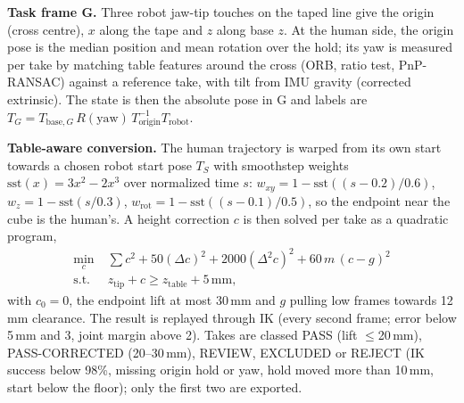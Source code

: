 \documentclass[conference,10pt]{IEEEtran}
\newcommand{\mm}{\,mm\xspace}
\begin{document}
\textbf{Task frame G.} Three robot jaw-tip touches on the taped line give the origin (cross centre), $x$ along the tape and $z$ along
base $z$. At the human side, the origin pose is the median position and mean rotation over the hold; its yaw is measured per take by
matching table features around the cross (ORB, ratio test, PnP-RANSAC) against a reference take, with tilt from IMU gravity
(corrected extrinsic). The state is then the absolute pose in G and labels are $T_G = T_{\text{base},G}\,R(\text{yaw})\,
T_\text{origin}^{-1}T_\text{robot}$.

\textbf{Table-aware conversion.} The human trajectory is warped from its own start towards a chosen robot start pose $T_S$ with
smoothstep weights $\mathrm{sst}(x)=3x^2-2x^3$ over normalized time $s$: $w_{xy}=1-\mathrm{sst}((s-0.2)/0.6)$, $w_z=1-\mathrm{sst}(s/0.3)$,
$w_\text{rot}=1-\mathrm{sst}((s-0.1)/0.5)$, so the endpoint near the cube is the human's. A height correction $c$ is then solved
per take as a quadratic program,
\begin{equation}
\begin{aligned}
\min_c\;& \textstyle\sum c^2+50(\Delta c)^2+2000(\Delta^2 c)^2+60\,m\,(c-g)^2\\
\text{s.t.}\;& z_\text{tip}+c\ge z_\text{table}+5\,\text{mm},
\end{aligned}
\end{equation}
with $c_0=0$, the endpoint lift at most 30\mm{} and $g$ pulling low frames towards 12\mm{} clearance. The result is replayed through
IK (every second frame; error below 5\mm{} and 3\textdegree, joint margin above 2\textdegree). Takes are classed PASS (lift
$\le$20\mm), PASS-CORRECTED (20--30\mm), REVIEW, EXCLUDED or REJECT (IK success below 98\%, missing origin hold or yaw, hold moved
more than 10\mm, start below the floor); only the first two are exported.
\end{document}
